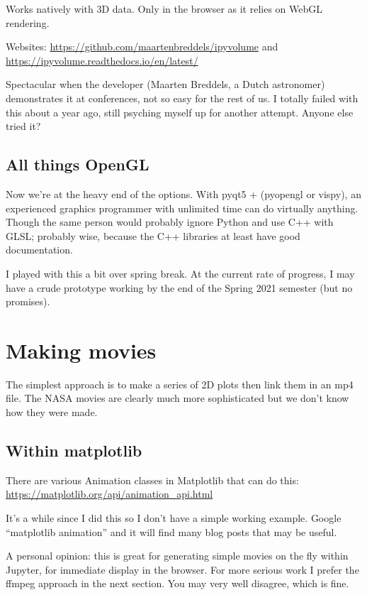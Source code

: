 Works natively with 3D data. Only in the browser as it relies on WebGL rendering.

Websites: \url{https://github.com/maartenbreddels/ipyvolume} and  \url{https://ipyvolume.readthedocs.io/en/latest/}

Spectacular when the developer (Maarten Breddels, a Dutch astronomer) demonstrates it at conferences, not so easy for the rest of us. I totally failed with this about a year ago, still psyching myself up for another attempt. Anyone else tried it?

\subsection{All things OpenGL}

Now we're at the heavy end of the options. With pyqt5 + (pyopengl or vispy), an experienced graphics programmer with unlimited time can do virtually anything. Though the same person would probably ignore Python and use C++ with GLSL; probably wise, because the C++ libraries at least have good documentation.

I played with this a bit over spring break. At the current rate of progress, I may have a crude prototype working by the end of the Spring 2021 semester (but no promises).

\section{Making movies}

The simplest approach is to make a series of 2D plots then link them in an mp4 file. The NASA movies are clearly much more sophisticated but we don't know how they were made.

\subsection{Within matplotlib}

There are various Animation classes in Matplotlib that can do this: 
\url{https://matplotlib.org/api/animation_api.html}

It's a while since I did this so I don't have a simple working example. Google ``matplotlib animation'' and it will find many blog posts that may be useful.

A personal opinion: this is great for generating simple movies on the fly within Jupyter, for immediate display in the browser. For more serious work I prefer the ffmpeg approach in the next section. You may very well disagree, which is fine.

